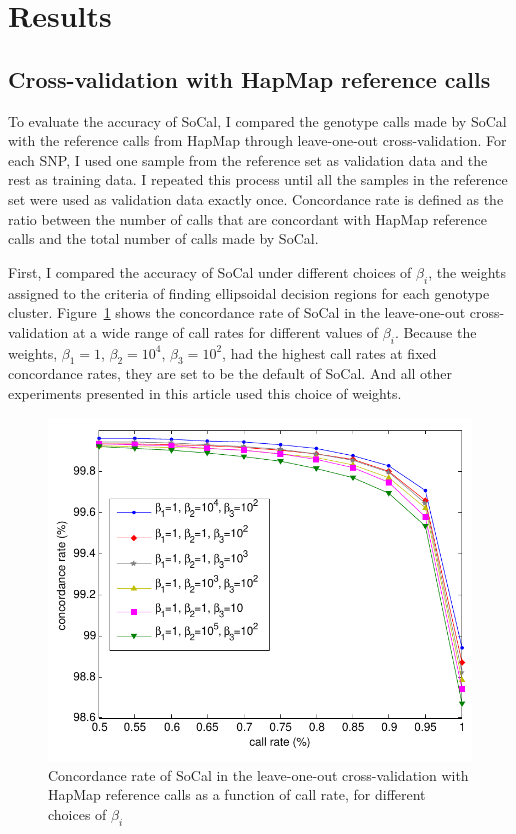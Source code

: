 \documentclass{scrartcl}
\begin{document}
\section{Results}

\subsection{Cross-validation with HapMap reference calls}

\par
To evaluate the accuracy of SoCal, I compared the genotype calls made by SoCal
with the reference calls from HapMap through leave-one-out
cross-validation.
For each SNP, I used one sample from the reference set as validation data and
the rest as training data.
I repeated this process until all the samples in the reference set were used
as validation data exactly once.
Concordance rate is defined as the ratio between the number of calls that are
concordant with HapMap reference calls and the total number of calls made by
SoCal.

\par
First, I compared the accuracy of SoCal under different choices of $\beta_i$,
the weights assigned to the criteria of finding ellipsoidal decision regions
for each genotype cluster.
Figure~\ref{fig:result_sh_crvacc} shows the concordance rate of SoCal in the
leave-one-out cross-validation at a wide range of call rates for different
values of $\beta_i$.
Because the weights, $\beta_1=1$, $\beta_2=10^4$, $\beta_3=10^2$,
had the highest call rates at fixed concordance rates, they are set to be the
default of SoCal.
And all other experiments presented in this article used this choice
of weights.

\begin{figure}[H]
\centering
\includegraphics[scale=0.75]
{result_figs/cmp_socal_hapmap/cmp_socal_hapmap_cr_vs_acc.pdf}
\caption{Concordance rate of SoCal in the leave-one-out cross-validation with
HapMap reference calls as a function of call rate, for different choices of
$\beta_i$}
\label{fig:result_sh_crvacc}
\end{figure}
\end{document}

